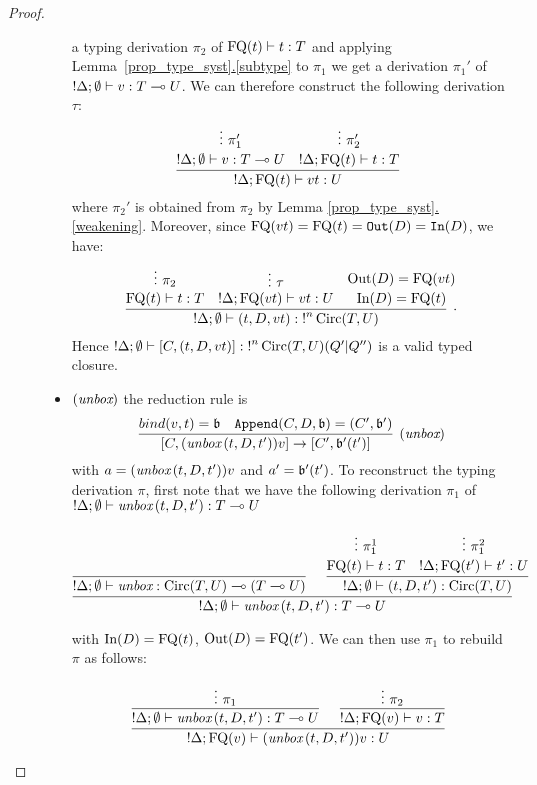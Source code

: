 \documentclass[twoside]{article}
\begin{document}
\begin{proof}
\begin{description}
\begin{itemize}
  a typing derivation $\pi_2$ of $\mathop{\textrm{FQ}}\nolimits(t)\vdash t:T$ and applying 
  Lemma~\hyperref[subtype]{\ref*{prop_type_syst}.\ref*{subtype}}
  to $\pi_1$ we get a derivation $\pi_1'$ of ${!}\Delta ;\emptyset\vdash v:T\multimap U$.
  We can therefore construct the following derivation $\tau$:
  \[
  \infer[]{{!}\Delta;\FQ(t)\entails vt : U}{
    \deduce[]{{!}\Delta ;\emptyset\entails v:T\loli U}{
      \vdots ~\pi_1'
    }
    &
    \deduce[]{{!}\Delta;\FQ(t)\entails t:T}{
      \vdots ~\pi_2'
    }
  }
  \]
  where $\pi_2'$ is obtained from $\pi_2$ by Lemma 
  \hyperref[weakening]{\ref*{prop_type_syst}.\ref*{weakening}}.
  Moreover, since $\mathop{\textrm{FQ}}\nolimits(vt)=\mathop{\textrm{FQ}}\nolimits(t)=\mathtt{Out}(D)=\mathtt{In}(D)$, 
  we have:
  \[
  \infer[.]{{!}\Delta;\emptyset \entails (t,D,vt):{!}^n\Circ(T,U)}{
    \deduce[]{\FQ(t)\entails t:T}{
      \vdots~\pi_2
    }
    &
    \deduce[]{{!}\Delta ; \FQ(vt)\entails vt:U}{
      \vdots~\tau
    } 
    &
    \deduce[]{\In(D)=\FQ(t) }{
      \Out(D)=\FQ(vt)
    }
  }
  \]  
  Hence ${!}\Delta ;\emptyset \vdash [C,(t,D,vt)]:{!}^n\mathop{\textrm{Circ}}\nolimits(T,U) (Q'|Q'')$ is 
  a valid typed closure.
  \item $(\mathop{\textit{unbox}}\nolimits)$ the reduction rule is
  \[
    \infer[(\unbox)]{[C,(\unbox\,(t,D,t'))v]\to [C',\binding'(t')]}{
      bind(v,t)=\binding 
      &
      \mathtt{Append}(C,D,\binding) = (C',\binding') 
    }
  \]
  with $a=(\mathop{\textit{unbox}}\nolimits\,(t,D,t'))v$ and $a'=\mathfrak{b}'(t')$. 
  To reconstruct the typing derivation $\pi$, first note 
  that we have the following derivation $\pi_1$ of    
  ${!}\Delta;\emptyset\vdash \mathop{\textit{unbox}}\nolimits\,(t,D,t'):T\multimap U$
  \begin{footnotesize}
  \[
    \infer[]{{!}\Delta;\emptyset\entails \unbox\,(t,D,t'):T\loli U}{
      \infer[]{{!}\Delta;\emptyset \entails \unbox:\Circ(T,U)\loli (T\loli U)}{
      }   
      &
      \infer[]{{!}\Delta ;\emptyset\entails (t,D,t'):\Circ(T,U)}{
        \deduce[]{\FQ(t)\entails t:T}{
          \vdots ~\pi_1^1
        }
        &
        \deduce[]{{!}\Delta;\FQ(t')\entails t':U}{
          \vdots ~\pi_1^2     
        }
      }
    }
    \]
    \end{footnotesize} 
  with $\mathop{\textrm{In}}\nolimits(D)=\mathop{\textrm{FQ}}\nolimits(t)$, $\mathop{\textrm{Out}}\nolimits(D)=\mathop{\textrm{FQ}}\nolimits(t')$. We can then use $\pi_1$ 
  to rebuild $\pi$ as follows:
  \begin{footnotesize}
  \[
  \infer[]{{!}\Delta; \FQ(v)\entails (\unbox\,(t,D,t'))v :U}{
    \infer[]{{!}\Delta;\emptyset\entails \unbox\,(t,D,t'):T\loli U}{
      \vdots~\pi_1            
    }
    &
    \infer[]{{!}\Delta ; \FQ(v)\entails v:T}{
      \vdots~\pi_2
    }
  }
  \]
  \end{footnotesize} 

\end{itemize}
\end{description}
\end{proof}
\end{document}

